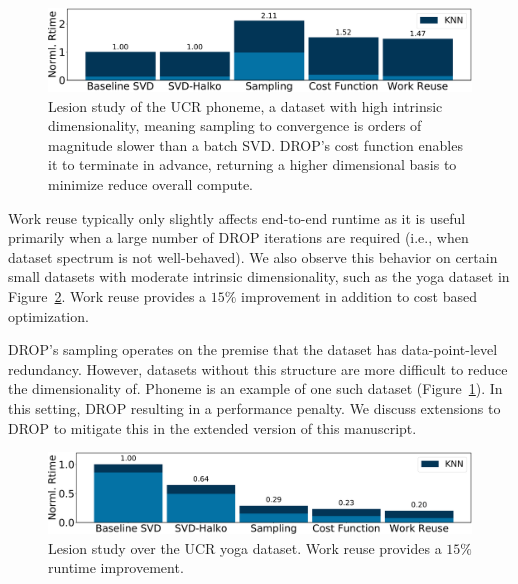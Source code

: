\begin{figure}
\includegraphics[width=\linewidth]{figs/phoneme-rev.pdf}
\caption[]{Lesion study of the UCR phoneme, a dataset with high intrinsic dimensionality, meaning sampling to convergence is orders of magnitude slower than a batch SVD. DROP's cost function enables it to terminate in advance, returning a higher dimensional basis to minimize reduce overall compute.}
\label{fig:phoneme_lesion}
\end{figure}

Work reuse typically only slightly affects end-to-end runtime as it is useful primarily when a large number of DROP iterations are required (i.e., when dataset spectrum is not well-behaved).
We also observe this behavior on certain small datasets with moderate intrinsic dimensionality, such as the yoga dataset in Figure~\ref{fig:yoga-lesion}. 
Work reuse provides a $15\%$ improvement in addition to cost based optimization.

DROP's sampling operates on the premise that the dataset has data-point-level redundancy. 
However, datasets without this structure are more difficult to reduce the dimensionality of.
Phoneme is an example of one such dataset (Figure~\ref{fig:phoneme_lesion}).  
In this setting, DROP  resulting in a performance penalty.
We discuss extensions to DROP to mitigate this in the extended version of this manuscript. 



\begin{figure}
\includegraphics[width=\linewidth]{figs/yoga-rev.pdf}
\caption[]{Lesion study over the UCR yoga dataset. Work reuse provides a $15\%$ runtime improvement.}
\label{fig:yoga-lesion}
\end{figure}

